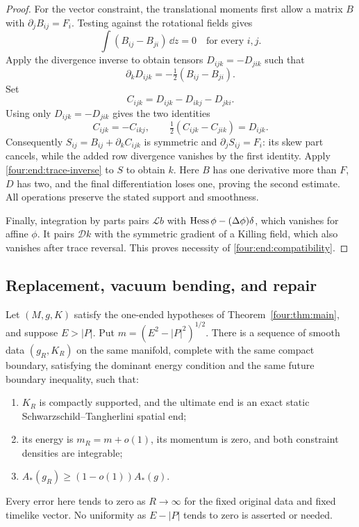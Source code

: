 \begin{proof}
For the vector constraint, the translational moments first allow a
matrix \(B\) with \(\partial_jB_{ij}=F_i\). Testing against the
rotational fields gives
\[
 \int(B_{ij}-B_{ji})\,\dd z=0\quad\text{for every }i,j.
\]
Apply the divergence inverse to obtain tensors \(D_{ijk}=-D_{jik}\)
such that
\[
 \partial_kD_{ijk}=-\tfrac12(B_{ij}-B_{ji}).
\]
Set
\[
 C_{ijk}=D_{ijk}-D_{ikj}-D_{jki}.
\]
Using only \(D_{ijk}=-D_{jik}\) gives the two identities
\[
 C_{ijk}=-C_{ikj},\qquad
 \tfrac12(C_{ijk}-C_{jik})=D_{ijk}.
\]
Consequently \(S_{ij}=B_{ij}+\partial_kC_{ijk}\) is symmetric and
\(\partial_jS_{ij}=F_i\): its skew part cancels, while the added row
divergence vanishes by the first identity. Apply
\eqref{four:end:trace-inverse} to \(S\) to obtain \(k\).
Here \(B\) has one derivative more than \(F\), \(D\) has two,
and the final differentiation loses one, proving the second estimate.
All operations preserve the stated support and smoothness.

Finally, integration by parts pairs \(\mathcal Lb\) with
\(\operatorname{Hess}\phi-(\Delta\phi)\delta\), which vanishes for affine
\(\phi\). It pairs \(\mathcal Dk\) with the symmetric gradient of
a Killing field, which also vanishes after trace reversal. This proves
necessity of \eqref{four:end:compatibility}.
\end{proof}

\subsection{Replacement, vacuum bending, and repair}

\begin{proposition}\label{four:prop:rest-end}
Let \((M,g,K)\) satisfy the one-ended hypotheses of
Theorem~\ref{four:thm:main}, and suppose \(E>|P|\). Put
\(m=(E^2-|P|^2)^{1/2}\). There is a sequence of smooth data
\((g_R,K_R)\) on the same manifold, complete with the same compact
boundary, satisfying the dominant energy condition and the same future
boundary inequality, such that:
\begin{enumerate}[label=\textup{(\roman*)}]
 \item \(K_R\) is compactly supported, and the ultimate end is an exact
 static Schwarzschild--Tangherlini spatial end;
 \item its energy is \(m_R=m+o(1)\), its momentum is zero, and both
 constraint densities are integrable;
 \item \(A_*(g_R)\ge(1-o(1))A_*(g)\).
\end{enumerate}
Every error here tends to zero as \(R\to\infty\) for the fixed original
data and fixed timelike vector. No uniformity as \(E-|P|\) tends to zero
is asserted or needed.
\end{proposition}

